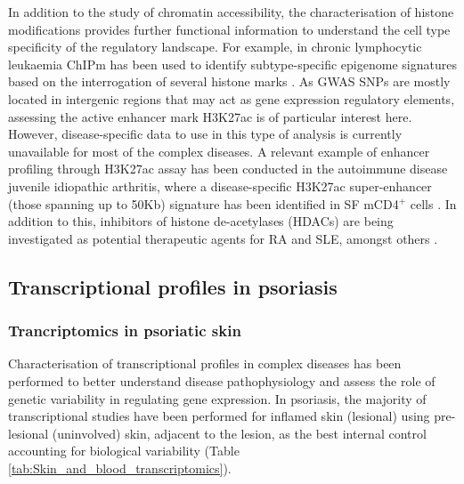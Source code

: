 In addition to the study of chromatin accessibility, the characterisation of histone modifications provides further functional information to understand the cell type specificity of the regulatory landscape. For example, in chronic lymphocytic leukaemia ChIPm has been used to identify subtype-specific epigenome signatures based on the interrogation of several histone marks \parencite{Rendeiro2016}. As GWAS SNPs are mostly located in intergenic regions that may act as gene expression regulatory elements, assessing the active enhancer mark H3K27ac is of particular interest here. %
However, disease-specific data to use in this type of analysis is currently unavailable for most of the complex diseases. A relevant example of enhancer profiling through H3K27ac assay has been conducted in the autoimmune disease juvenile idiopathic arthritis, where a disease-specific H3K27ac super-enhancer (those spanning up to 50Kb) signature has been identified in SF mCD4$^+$ cells \parencite{Peeters2015}. In addition to this, inhibitors of histone de-acetylases (HDACs) are being investigated as potential therapeutic agents for RA and SLE, amongst others \parencite{Hsieh2014,Shu2017}.




\subsection{Transcriptional profiles in psoriasis}

\subsubsection{Trancriptomics in psoriatic skin}
Characterisation of transcriptional profiles in complex diseases has been performed to better understand disease pathophysiology and assess the role of genetic variability in regulating gene expression. In psoriasis, the majority of transcriptional studies have been performed for inflamed skin (lesional) using pre-lesional (uninvolved) skin, adjacent to the lesion, as the best internal control accounting for biological variability (Table \ref{tab:Skin_and_blood_transcriptomics}). 

